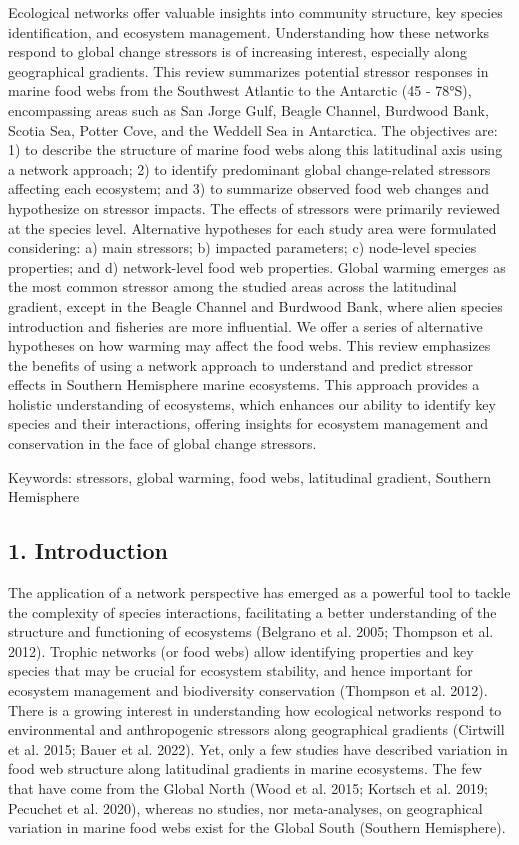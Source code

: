 \documentclass[
]{article}
\begin{document}
Ecological networks offer valuable insights into community structure,
key species identification, and ecosystem management. Understanding how
these networks respond to global change stressors is of increasing
interest, especially along geographical gradients. This review
summarizes potential stressor responses in marine food webs from the
Southwest Atlantic to the Antarctic (45 - 78°S), encompassing areas such
as San Jorge Gulf, Beagle Channel, Burdwood Bank, Scotia Sea, Potter
Cove, and the Weddell Sea in Antarctica. The objectives are: 1) to
describe the structure of marine food webs along this latitudinal axis
using a network approach; 2) to identify predominant global
change-related stressors affecting each ecosystem; and 3) to summarize
observed food web changes and hypothesize on stressor impacts. The
effects of stressors were primarily reviewed at the species level.
Alternative hypotheses for each study area were formulated considering:
a) main stressors; b) impacted parameters; c) node-level species
properties; and d) network-level food web properties. Global warming
emerges as the most common stressor among the studied areas across the
latitudinal gradient, except in the Beagle Channel and Burdwood Bank,
where alien species introduction and fisheries are more influential. We
offer a series of alternative hypotheses on how warming may affect the
food webs. This review emphasizes the benefits of using a network
approach to understand and predict stressor effects in Southern
Hemisphere marine ecosystems. This approach provides a holistic
understanding of ecosystems, which enhances our ability to identify key
species and their interactions, offering insights for ecosystem
management and conservation in the face of global change stressors.

Keywords: stressors, global warming, food webs, latitudinal gradient,
Southern Hemisphere

\subsection{1. Introduction}\label{introduction}

The application of a network perspective has emerged as a powerful tool
to tackle the complexity of species interactions, facilitating a better
understanding of the structure and functioning of ecosystems (Belgrano
et al. 2005; Thompson et al. 2012). Trophic networks (or food webs)
allow identifying properties and key species that may be crucial for
ecosystem stability, and hence important for ecosystem management and
biodiversity conservation (Thompson et al. 2012). There is a growing
interest in understanding how ecological networks respond to
environmental and anthropogenic stressors along geographical gradients
(Cirtwill et al. 2015; Bauer et al. 2022). Yet, only a few studies have
described variation in food web structure along latitudinal gradients in
marine ecosystems. The few that have come from the Global North (Wood et
al. 2015; Kortsch et al. 2019; Pecuchet et al. 2020), whereas no
studies, nor meta-analyses, on geographical variation in marine food
webs exist for the Global South (Southern Hemisphere).
\end{document}
